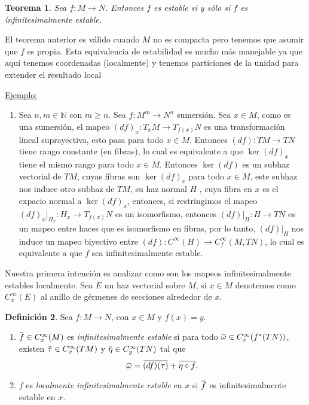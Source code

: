 \documentclass{report}
\newtheorem{theorem}{Teorema}[section]
\theoremstyle{definition}
\newtheorem{defi}[theorem]{Definici\'on}
\newcommand{\overbar}[1]{\mkern 1.5mu\overline{\mkern-1.5mu#1\mkern-1.5mu}\mkern 1.5mu}
\begin{document}
\begin{theorem}
Sea $f:M \to N$. Entonces $f$ es estable si y s\'olo si $f$ es infinitesimalmente estable.
\end{theorem}

El teorema anterior es v\'alido cuando $M$ no es compacta pero tenemos que asumir que $f$ es propia. Esta equivalencia de estabilidad es mucho m\'as manejable ya que aqu\'i tenemos coordenadas (localmente) y tenemos particiones de la unidad para extender el resultado local

\underline{Ejemplo:} 

\begin{enumerate}
\item Sea $n,m \in \mathbb{N}$ con $m \geq n$. Sea $f:M^m \to N^n$ sumersi\'on. Sea $x \in M$, como es una sumersi\'on, el mapeo $(df)_x: T_x M \to T_{f(x)}N$ es una transformaci\'on lineal suprayectiva, esto pasa para todo $x \in M$. Entonces $(df): TM \to TN$ tiene rango constante (en fibras), lo cual es equivalente a que $\ker(df)_x$ tiene el mismo rango para todo $x \in M$. Entonces $\ker (df)$ es un subhaz vectorial de $TM$, cuyas fibras son $\ker(df)_x$ para todo $x \in M$, este subhaz nos induce otro subhaz de $TM$, su haz normal $H$ , cuya fibra en $x$ es el expacio normal a $\ker (df)_x$, entonces, si restringimos el mapeo $(df)_x \vert_{H_x}: H_x \to T_{f(x)} N$ es un isomorfismo, entonces $(df)\vert_{H}: H \to TN$ es un mapeo entre haces que es isomorfismo en fibras, por lo tanto, $(df) \vert_{H}$ nos induce un mapeo biyectivo entre $ (df): C^\infty (H) \to C^\infty_{f} (M,TN)$, lo cual es equivalente a que $f$ sea infinitesimalmente estable.
\end{enumerate}

Nuestra primera intenci\'on es analizar como son los mapeos infinitesimalmente estables localmente. Sea $E$ un haz vectorial sobre $M$, si $x \in M$ denotemos como $C^\infty_x (E)$ al anillo de g\'ermenes de secciones alrededor de $x$.
\begin{defi}
Sea $f:M \to N$, con $x \in M$ y $f(x) = y$.
\begin{enumerate}
\item $\overbar{f} \in C^\infty_x (M)$ es \textit{infinitesimalmente estable} si para todo $\overbar{\omega} \in C^\infty_x (f^\ast (TN))$, existen $\overbar{\tau} \in C^\infty_x (TM)$ y $\overbar{\eta} \in C^\infty_y (TN)$ tal que $$\overbar{\omega} = \overbar{(df)(\tau)} + \overbar{\eta \circ f}.$$
\item $f$ es \textit{localmente infinitesimalmente estable} en $x$ si $\overbar{f}$ es infinitesimalmente estable en $x$.
\end{enumerate}
\end{defi}
\end{document}
